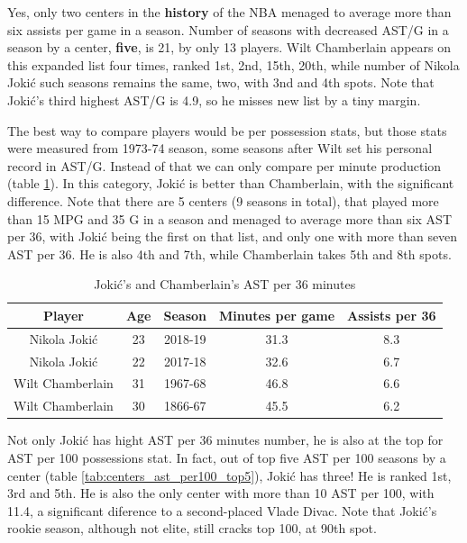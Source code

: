 \documentclass[a4paper]{article}
\begin{document}
Yes, only two centers in the \textbf{history} of the NBA menaged to average more than six assists per game in a season. Number of seasons with decreased AST/G in a season by a center, \textbf{five}, is 21, by only 13 players. Wilt Chamberlain appears on this expanded list four times, ranked 1st, 2nd, 15th, 20th, while number of Nikola Joki\' c such seasons remains the same, two, with 3nd and 4th spots. Note that Joki\' c's third highest AST/G is 4.9, so he misses new list by a tiny margin.

The best way to compare players would be per possession stats, but those stats were measured from 1973-74 season, some seasons after Wilt set his personal record in AST/G. Instead of that we can only compare per minute production (table \ref{tab:jokic_wilt_per_36}). In this category, Joki\' c is better than Chamberlain, with the significant difference. Note that there are 5 centers (9 seasons in total), that played more than 15 MPG and 35 G in a season and menaged to average more than six AST per 36, with Joki\' c being the first on that list, and only one with more than seven AST per 36. He is also 4th and 7th, while Chamberlain takes 5th and 8th spots.

\begin{table}[h!]
\begin{center}
\begin{tabular}{|c|c|c|c|c|} \hline
\textbf{Player} & \textbf{Age} & \textbf{Season} & \textbf{Minutes per game} & \textbf{Assists per 36} \\ \hline
Nikola Jokić & 23 & 2018-19 & 31.3 & 8.3 \\ \hline
Nikola Jokić & 22 & 2017-18 & 32.6 & 6.7 \\ \hline
Wilt Chamberlain & 31 & 1967-68 & 46.8 & 6.6 \\ \hline
Wilt Chamberlain & 30 & 1866-67 & 45.5 & 6.2 \\ \hline
\end{tabular}
\caption{Joki\' c's and Chamberlain's AST per 36 minutes}
\label{tab:jokic_wilt_per_36}
\end{center}
\end{table} 

Not only Joki\' c has hight AST per 36 minutes number, he is also at the top for AST per 100 possessions stat. In fact, out of top five AST per 100 seasons by a center (table \ref{tab:centers_ast_per100_top5}), Joki\' c has three! He is ranked 1st, 3rd and 5th. He is also the only center with more than 10 AST per 100, with 11.4, a significant diference to a second-placed Vlade Divac. Note that Joki\' c's rookie season, although not elite, still cracks top 100, at 90th spot.
\end{document}
